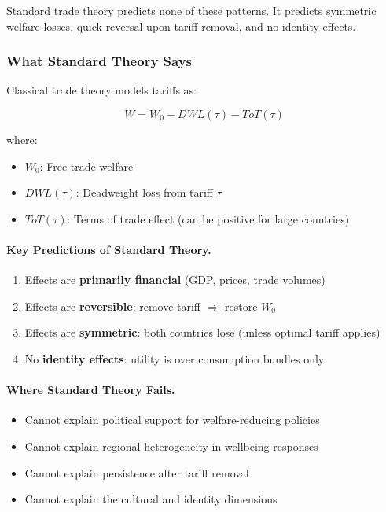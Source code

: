 Standard trade theory predicts none of these patterns. It predicts symmetric welfare 
losses, quick reversal upon tariff removal, and no identity effects.

\subsubsection{What Standard Theory Says}

Classical trade theory \citep{krugman1980, helpman1985} models tariffs as:

\begin{equation}
W = W_0 - DWL(\tau) - ToT(\tau)
\end{equation}

where:
\begin{itemize}
    \item $W_0$: Free trade welfare
    \item $DWL(\tau)$: Deadweight loss from tariff $\tau$
    \item $ToT(\tau)$: Terms of trade effect (can be positive for large countries)
\end{itemize}

\paragraph{Key Predictions of Standard Theory.}
\begin{enumerate}
    \item Effects are \textbf{primarily financial} (GDP, prices, trade volumes)
    \item Effects are \textbf{reversible}: remove tariff $\Rightarrow$ restore $W_0$
    \item Effects are \textbf{symmetric}: both countries lose (unless optimal tariff applies)
    \item No \textbf{identity effects}: utility is over consumption bundles only
\end{enumerate}

\paragraph{Where Standard Theory Fails.}
\begin{itemize}
    \item Cannot explain political support for welfare-reducing policies
    \item Cannot explain regional heterogeneity in wellbeing responses
    \item Cannot explain persistence after tariff removal
    \item Cannot explain the cultural and identity dimensions
\end{itemize}

